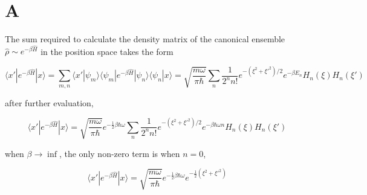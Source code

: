 \section{A}

The sum required to calculate the density matrix of the canonical ensemble $\hat{\rho}\sim e^{-\beta\hat{H}}$ in the position space takes the form

\begin{equation}
    \langle x'|e^{-\beta\hat{H}}|x\rangle = \sum_{m,n}\langle x'|\psi_m\rangle\langle\psi_m|e^{-\beta\hat{H}}|\psi_n\rangle\langle\psi_n|x\rangle=\sqrt{\frac{m\omega}{\pi\hbar}}\sum_n\frac{1}{2^nn!}e^{-(\xi^2+\xi'^2)/2}e^{-\beta E_n}H_n(\xi)H_n(\xi')
\end{equation}

after further evaluation,

\begin{equation}
    \langle x'|e^{-\beta\hat{H}}|x\rangle = \sqrt{\frac{m\omega}{\pi\hbar}}e^{-\frac{1}{2}\beta\hbar\omega}\sum_n\frac{1}{2^nn!}e^{-(\xi^2+\xi'^2)/2}e^{-\beta\hbar\omega n}H_n(\xi)H_n(\xi')
\end{equation}

when $\beta\rightarrow\inf$, the only non-zero term is when $n=0$, 

\begin{equation}
    \langle x'|e^{-\beta\hat{H}}|x\rangle = \sqrt{\frac{m\omega}{\pi\hbar}}e^{-\frac{1}{2}\beta\hbar\omega}e^{-\frac{1}{2}(\xi^2+\xi'^2)}
\end{equation}



